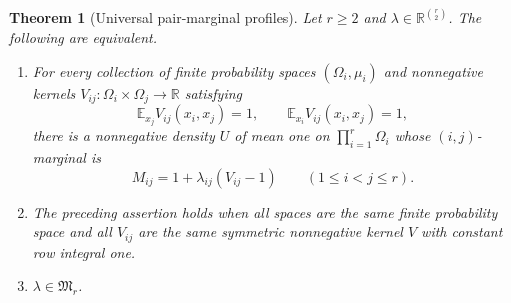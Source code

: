 \documentclass[a4paper,11pt,reqno]{amsart}
\theoremstyle{plain}
\newtheorem{theorem}{Theorem}[section]
\theoremstyle{definition}
\theoremstyle{remark}
\begin{document}
\begin{theorem}[Universal pair-marginal profiles]
\label{density-universal-profiles}
Let $r\ge2$ and $\lambda\in\mathbb R^{\binom r2}$.  The following
are equivalent.
\begin{enumerate}
\item For every collection of finite probability spaces
$(\Omega_i,\mu_i)$ and nonnegative kernels
$V_{ij}:\Omega_i\times\Omega_j\to\mathbb R$ satisfying
\[
 \mathbb E_{x_j}V_{ij}(x_i,x_j)=1,
 \qquad \mathbb E_{x_i}V_{ij}(x_i,x_j)=1,
\]
there is a nonnegative density $U$ of mean one on
$\prod_{i=1}^r\Omega_i$ whose $(i,j)$-marginal is
\[
 M_{ij}=1+\lambda_{ij}(V_{ij}-1)
 \qquad(1\le i<j\le r).
\]
\item The preceding assertion holds when all spaces are the same
finite probability space and all $V_{ij}$ are the same symmetric
nonnegative kernel $V$ with constant row integral one.
\item $\lambda\in\mathfrak M_r$.
\end{enumerate}
\end{theorem}
\end{document}
